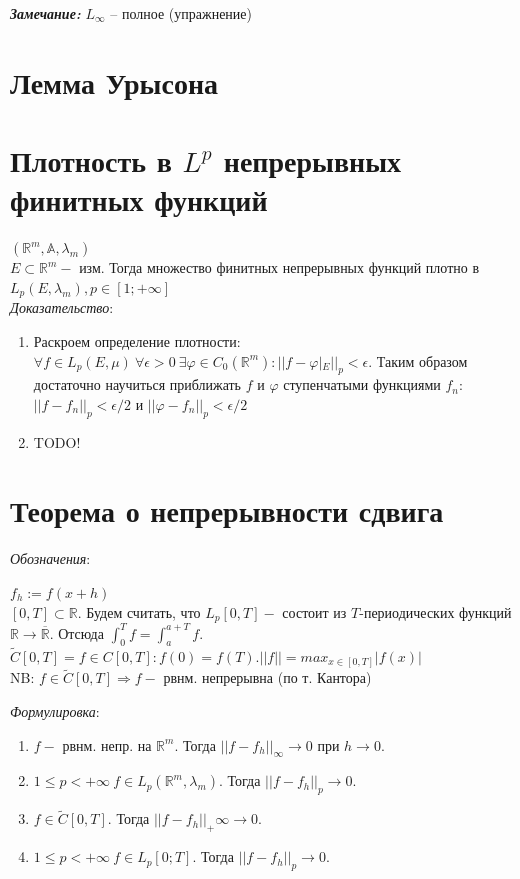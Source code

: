 \documentclass[paper=a4, fontsize=17pt]{article}
\begin{document}
\textbf{\emph{Замечание:}} $ L_{\infty} $ -- полное (упражнение)

\section{Лемма Урысона}

\section{Плотность в $L^p$ непрерывных финитных функций}
$(\mathbb{R}^m, \mathbb{A}, \lambda_m)$\\

$E \subset \mathbb{R}^m -$ изм. Тогда множество финитных непрерывных функций плотно в $L_p(E, \lambda_m), p \in [1; +\infty]$\\

\emph{Доказательство}:

\begin{enumerate}
	\item  Раскроем определение плотности: $\forall f \in L_p(E, \mu) \ \forall \epsilon > 0 \ \exists \varphi \in C_0(\mathbb{R}^m): ||f - \varphi|_E ||_p < \epsilon$. Таким образом достаточно научиться приближать $f$ и  $\varphi$ ступенчатыми функциями $f_n$: $||f-f_n||_p < \epsilon /2 $ и $||\varphi-f_n||_p < \epsilon /2 $

	\item	 TODO!

\end{enumerate}


\section{Теорема о непрерывности сдвига}
\emph{Обозначения}:

$f_h := f(x+h)$ \\
$[0, T] \subset \mathbb{R}.$ Будем считать, что $L_p[0, T] -$ состоит из $T$-периодических функций $\mathbb{R} \rightarrow \overline {\mathbb{R}}$. Отсюда $\int_{0}^{T} f = \int_{a}^{a+T} f.$ \\
$\widetilde{C}[0, T] = {f \in C[0, T]: f(0) = f(T) }. ||f|| = max_{x\in[0,T]}|f(x)|$ \\
NB: $f \in \widetilde{C}[0, T] \Rightarrow f -$ рвнм. непрерывна (по т. Кантора)

\emph{Формулировка}:
\begin{enumerate}
	\item $f - $ рвнм. непр. на $\mathbb{R}^m$. Тогда $||f-f_h||_\infty \rightarrow 0$ при $h\rightarrow 0$.
	\item $1 \leq p < + \infty \ f \in L_p(\mathbb{R}^m, \lambda_m)$. Тогда $||f-f_h||_p \rightarrow 0$.
	\item $f \in \widetilde{C}[0, T]$. Тогда $||f-f_h||_+\infty \rightarrow 0$.
	\item $1 \leq p < + \infty \  f \in L_p[0; T]$. Тогда $||f-f_h||_p \rightarrow 0$.
\end{enumerate}
\end{document}
